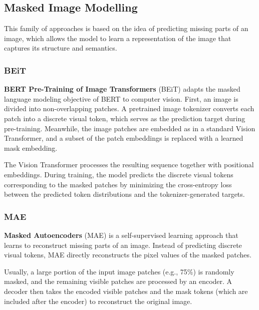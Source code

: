 \subsection{Masked Image Modelling}
This family of approaches is based on the idea of predicting missing parts of an image, which allows the model to learn a representation of the image that captures its structure and semantics.

\subsubsection{BEiT}
\textbf{BERT Pre-Training of Image Transformers} (BEiT) adapts the masked language modeling objective of BERT to computer vision. 
First, an image is divided into non-overlapping patches. 
A pretrained image tokenizer converts each patch into a discrete visual token, which serves as the prediction target during pre-training. 
Meanwhile, the image patches are embedded as in a standard Vision Transformer, and a subset of the patch embeddings is replaced with a learned mask embedding. 

The Vision Transformer processes the resulting sequence together with positional embeddings. 
During training, the model predicts the discrete visual tokens corresponding to the masked patches by minimizing the cross-entropy loss between the predicted token distributions and the tokenizer-generated targets.

\subsubsection{MAE}
\textbf{Masked Autoencoders} (MAE) is a self-supervised learning approach that learns to reconstruct missing parts of an image.
Instead of predicting discrete visual tokens, MAE directly reconstructs the pixel values of the masked patches.

Usually, a large portion of the input image patches (e.g., 75\%) is randomly masked, and the remaining visible patches are processed by an encoder.
A decoder then takes the encoded visible patches and the mask tokens (which are included after the encoder) to reconstruct the original image.

